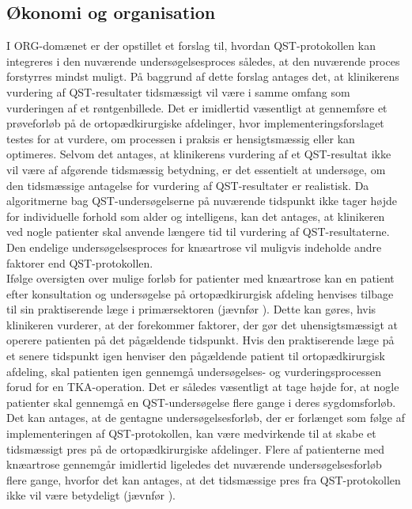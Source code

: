 \subsection{Økonomi og organisation} \label {ECO_ORG} %
I ORG-domænet er der opstillet et forslag til, hvordan QST-protokollen kan integreres i den nuværende undersøgelsesproces således, at den nuværende proces forstyrres mindst muligt. På baggrund af dette forslag antages det, at klinikerens vurdering af QST-resultater tidsmæssigt vil være i samme omfang som vurderingen af et røntgenbillede. Det er imidlertid væsentligt at gennemføre et prøveforløb på de ortopædkirurgiske afdelinger, hvor implementeringsforslaget testes for at vurdere, om processen i praksis er hensigtsmæssig eller kan optimeres. Selvom det antages, at klinikerens vurdering af et QST-resultat ikke vil være af afgørende tidsmæssig betydning, er det essentielt at undersøge, om den tidsmæssige antagelse for vurdering af QST-resultater er realistisk. Da algoritmerne bag QST-undersøgelserne på nuværende tidspunkt ikke tager højde for individuelle forhold som alder og intelligens, kan det antages, at klinikeren ved nogle patienter skal anvende længere tid til vurdering af QST-resultaterne. Den endelige undersøgelsesproces for knæartrose vil muligvis indeholde andre faktorer end QST-protokollen.\\ 
Ifølge oversigten over mulige forløb for patienter med knæartrose kan en patient efter konsultation og undersøgelse på ortopædkirurgisk afdeling henvises tilbage til sin praktiserende læge i primærsektoren (jævnfør ). Dette kan gøres, hvis klinikeren vurderer, at der forekommer faktorer, der gør det uhensigtsmæssigt at operere patienten på det pågældende tidspunkt. Hvis den praktiserende læge på et senere tidspunkt igen henviser den pågældende patient til ortopædkirurgisk afdeling, skal patienten igen gennemgå undersøgelses- og vurderingsprocessen forud for en TKA-operation. Det er således væsentligt at tage højde for, at nogle patienter skal gennemgå en QST-undersøgelse flere gange i deres sygdomsforløb. Det kan antages, at de gentagne undersøgelsesforløb, der er forlænget som følge af implementeringen af QST-protokollen, kan være medvirkende til at skabe et tidsmæssigt pres på de ortopædkirurgiske afdelinger. Flere af patienterne med knæartrose gennemgår imidlertid ligeledes det nuværende undersøgelsesforløb flere gange, hvorfor det kan antages, at det tidsmæssige pres fra QST-protokollen ikke vil være betydeligt (jævnfør ). \\ 

